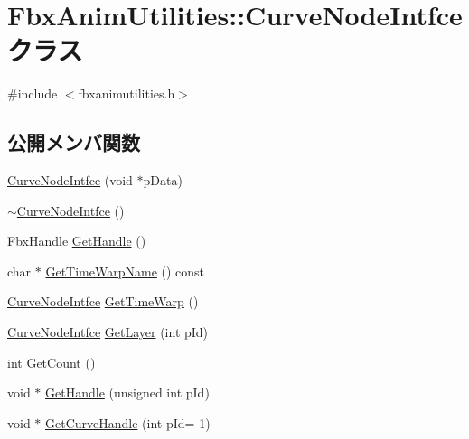 \hypertarget{class_fbx_anim_utilities_1_1_curve_node_intfce}{}\section{Fbx\+Anim\+Utilities\+:\+:Curve\+Node\+Intfce クラス}
\label{class_fbx_anim_utilities_1_1_curve_node_intfce}


{\ttfamily \#include $<$fbxanimutilities.\+h$>$}

\subsection*{公開メンバ関数}
\begin{DoxyCompactItemize}
\item 
\hyperlink{class_fbx_anim_utilities_1_1_curve_node_intfce_a6f3f8be16037c0e517ca91580c2babad}{Curve\+Node\+Intfce} (void $\ast$p\+Data)
\item 
\hyperlink{class_fbx_anim_utilities_1_1_curve_node_intfce_a2cadc9ec91cd2edc68f9b1f5ead8d6e0}{$\sim$\+Curve\+Node\+Intfce} ()
\item 
Fbx\+Handle \hyperlink{class_fbx_anim_utilities_1_1_curve_node_intfce_a77cd99f751eeadf589d2a47866d997a5}{Get\+Handle} ()
\item 
char $\ast$ \hyperlink{class_fbx_anim_utilities_1_1_curve_node_intfce_a072f002e5d35a947ec85e5b1090033d3}{Get\+Time\+Warp\+Name} () const
\item 
\hyperlink{class_fbx_anim_utilities_1_1_curve_node_intfce}{Curve\+Node\+Intfce} \hyperlink{class_fbx_anim_utilities_1_1_curve_node_intfce_a74183442c98ffd57b606ca7757cde024}{Get\+Time\+Warp} ()
\item 
\hyperlink{class_fbx_anim_utilities_1_1_curve_node_intfce}{Curve\+Node\+Intfce} \hyperlink{class_fbx_anim_utilities_1_1_curve_node_intfce_a19ff23646e1a540dfcd92be5c564df51}{Get\+Layer} (int p\+Id)
\item 
int \hyperlink{class_fbx_anim_utilities_1_1_curve_node_intfce_a773e8929f507e259bf5eec00dfcbd347}{Get\+Count} ()
\item 
void $\ast$ \hyperlink{class_fbx_anim_utilities_1_1_curve_node_intfce_a05699a7871d5e7a24c8fda87e82e191a}{Get\+Handle} (unsigned int p\+Id)
\item 
void $\ast$ \hyperlink{class_fbx_anim_utilities_1_1_curve_node_intfce_ac3ed71abe84d3f7d378dd01249a1ac05}{Get\+Curve\+Handle} (int p\+Id=-\/1)
\item 

\end{DoxyCompactItemize}
